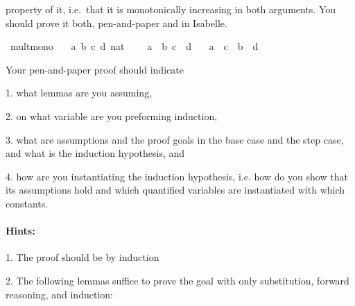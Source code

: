 \begin{isabellebody}
\begin{isamarkuptext}
      property of it, i.e.\ that it is monotonically increasing in both arguments. You should prove
      it both, pen-and-paper and in Isabelle.%
\end{isamarkuptext}\isamarkuptrue%
\isamarkupfalse%
\ mult{\isacharunderscore}{\kern0pt}mono{\isacharcolon}{\kern0pt}\isanewline
\ \ \ a\ b\ c\ d{\isacharcolon}{\kern0pt}{\isacharcolon}{\kern0pt}\ nat\ %
\isanewline
\ \ \ {\isachardoublequoteopen}a\ {\isasymle}\ b{\isachardoublequoteclose}\ {\isachardoublequoteopen}c\ {\isasymle}\ d{\isachardoublequoteclose}\isanewline
\ \ \ {\isachardoublequoteopen}a\ {\isacharasterisk}{\kern0pt}\ c\ {\isasymle}\ b\ {\isacharasterisk}{\kern0pt}\ d{\isachardoublequoteclose}%
\begin{isamarkuptext}%
Your pen-and-paper proof should indicate

 1. what lemmas are you assuming,

 2. on what variable are you preforming induction,

 3. what are assumptions and the proof goals in the base case and the step case, and what is the
    induction hypothesis, and

 4. how are you instantiating the induction hypothesis, i.e. how do you show that its assumptions
    hold and which quantified variables are instantiated with which constants.

\paragraph{Hints:}
 1. The proof should be by induction

 2. The following lemmas suffice to prove the goal with only substitution, forward reasoning, and
     induction:



\end{isamarkuptext}
\end{isabellebody}
